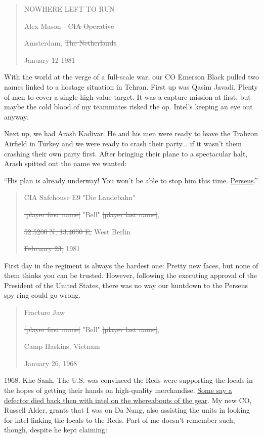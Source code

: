 \documentclass{article}
\begin{document}
\begin{quote}
    NOWHERE LEFT TO RUN
    
    Alex Mason - \sout{CIA Operative}
    
    Amsterdam, \sout{The Netherlands}
    
    \sout{January 12} 1981
\end{quote}

With the world at the verge of a full-scale war, our CO Emerson Black pulled two names linked to a hostage situation in Tehran. First up was Qasim Javadi. Plenty of men to cover a single high-value target. It was a capture mission at first, but maybe the cold blood of my teammates risked the op. Intel's keeping an eye out anyway.

Next up, we had Arash Kadivar. He and his men were ready to leave the Trabzon Airfield in Turkey and we were ready to crash their party... if it wasn't them crashing their own party first. After bringing their plane to a spectacular halt, Arash spitted out the name we wanted:

“His plan is already underway! You won't be able to stop him this time. \href{https://callofduty.fandom.com/wiki/Perseus_(Cold_War)}{Perseus}.”

\begin{quote}
    CIA Safehouse E9 "Die Landebahn"
    
    \sout{[player first name]} "Bell" \sout{[player last name]},
    
    \sout{52.5200 N, 13.4050 E,} West Berlin
    
    \sout{February 23,} 1981
\end{quote}

First day in the regiment is always the hardest one: Pretty new faces, but none of them thinks you can be trusted. However, following the executing approval of the President of the United States, there was no way our huntdown to the Perseus spy ring could go wrong.

\begin{quote}
    Fracture Jaw
    
    \sout{[player first name]} "Bell" \sout{[player last name]},
    
    Camp Haskins, Vietnam
    
    January 26, 1968
\end{quote}

1968. Khe Sanh. The U.S. was convinced the Reds were supporting the locals in the hopes of getting their hands on high-quality merchandise. \href{https://callofduty.fandom.com/wiki/S.O.G./Transcript?so=search}{Some say a defector died back then with intel on the whereabouts of the gear}. My new CO, Russell Alder, grants that I was on Da Nang, also assisting the units in looking for intel linking the locals to the Reds. Part of me doesn't remember such, though, despite he kept claiming:
\end{document}

